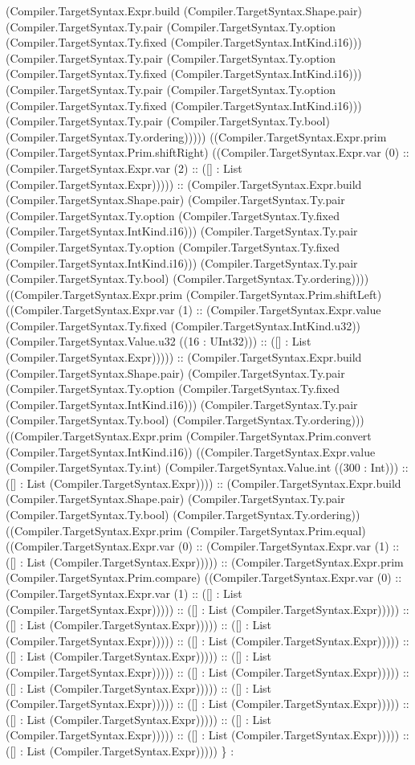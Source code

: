 \documentclass[11pt]{article}
\begin{document}
(Compiler.TargetSyntax.Expr.build (Compiler.TargetSyntax.Shape.pair) (Compiler.TargetSyntax.Ty.pair (Compiler.TargetSyntax.Ty.option (Compiler.TargetSyntax.Ty.fixed (Compiler.TargetSyntax.IntKind.i16))) (Compiler.TargetSyntax.Ty.pair (Compiler.TargetSyntax.Ty.option (Compiler.TargetSyntax.Ty.fixed (Compiler.TargetSyntax.IntKind.i16))) (Compiler.TargetSyntax.Ty.pair (Compiler.TargetSyntax.Ty.option (Compiler.TargetSyntax.Ty.fixed (Compiler.TargetSyntax.IntKind.i16))) (Compiler.TargetSyntax.Ty.pair (Compiler.TargetSyntax.Ty.bool) (Compiler.TargetSyntax.Ty.ordering))))) ((Compiler.TargetSyntax.Expr.prim (Compiler.TargetSyntax.Prim.shiftRight) ((Compiler.TargetSyntax.Expr.var (0) :: (Compiler.TargetSyntax.Expr.var (2) :: ([] : List (Compiler.TargetSyntax.Expr))))) :: (Compiler.TargetSyntax.Expr.build (Compiler.TargetSyntax.Shape.pair) (Compiler.TargetSyntax.Ty.pair (Compiler.TargetSyntax.Ty.option (Compiler.TargetSyntax.Ty.fixed (Compiler.TargetSyntax.IntKind.i16))) (Compiler.TargetSyntax.Ty.pair (Compiler.TargetSyntax.Ty.option (Compiler.TargetSyntax.Ty.fixed (Compiler.TargetSyntax.IntKind.i16))) (Compiler.TargetSyntax.Ty.pair (Compiler.TargetSyntax.Ty.bool) (Compiler.TargetSyntax.Ty.ordering)))) ((Compiler.TargetSyntax.Expr.prim (Compiler.TargetSyntax.Prim.shiftLeft) ((Compiler.TargetSyntax.Expr.var (1) :: (Compiler.TargetSyntax.Expr.value (Compiler.TargetSyntax.Ty.fixed (Compiler.TargetSyntax.IntKind.u32)) (Compiler.TargetSyntax.Value.u32 ((16 : UInt32))) :: ([] : List (Compiler.TargetSyntax.Expr))))) :: (Compiler.TargetSyntax.Expr.build (Compiler.TargetSyntax.Shape.pair) (Compiler.TargetSyntax.Ty.pair (Compiler.TargetSyntax.Ty.option (Compiler.TargetSyntax.Ty.fixed (Compiler.TargetSyntax.IntKind.i16))) (Compiler.TargetSyntax.Ty.pair (Compiler.TargetSyntax.Ty.bool) (Compiler.TargetSyntax.Ty.ordering))) ((Compiler.TargetSyntax.Expr.prim (Compiler.TargetSyntax.Prim.convert (Compiler.TargetSyntax.IntKind.i16)) ((Compiler.TargetSyntax.Expr.value (Compiler.TargetSyntax.Ty.int) (Compiler.TargetSyntax.Value.int ((300 : Int))) :: ([] : List (Compiler.TargetSyntax.Expr)))) :: (Compiler.TargetSyntax.Expr.build (Compiler.TargetSyntax.Shape.pair) (Compiler.TargetSyntax.Ty.pair (Compiler.TargetSyntax.Ty.bool) (Compiler.TargetSyntax.Ty.ordering)) ((Compiler.TargetSyntax.Expr.prim (Compiler.TargetSyntax.Prim.equal) ((Compiler.TargetSyntax.Expr.var (0) :: (Compiler.TargetSyntax.Expr.var (1) :: ([] : List (Compiler.TargetSyntax.Expr))))) :: (Compiler.TargetSyntax.Expr.prim (Compiler.TargetSyntax.Prim.compare) ((Compiler.TargetSyntax.Expr.var (0) :: (Compiler.TargetSyntax.Expr.var (1) :: ([] : List (Compiler.TargetSyntax.Expr))))) :: ([] : List (Compiler.TargetSyntax.Expr))))) :: ([] : List (Compiler.TargetSyntax.Expr))))) :: ([] : List (Compiler.TargetSyntax.Expr))))) :: ([] : List (Compiler.TargetSyntax.Expr))))) :: ([] : List (Compiler.TargetSyntax.Expr))))) :: ([] : List (Compiler.TargetSyntax.Expr))))) :: ([] : List (Compiler.TargetSyntax.Expr))))) :: ([] : List (Compiler.TargetSyntax.Expr))))) :: ([] : List (Compiler.TargetSyntax.Expr))))) :: ([] : List (Compiler.TargetSyntax.Expr))))) :: ([] : List (Compiler.TargetSyntax.Expr))))) :: ([] : List (Compiler.TargetSyntax.Expr))))) :: ([] : List (Compiler.TargetSyntax.Expr))))) :: ([] : List (Compiler.TargetSyntax.Expr))))) \} : 
\end{document}
